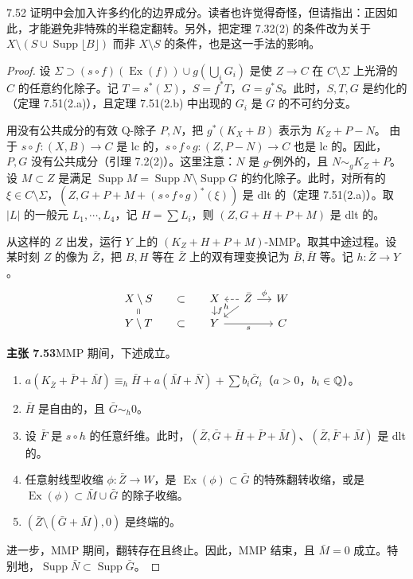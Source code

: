 \begin{remark}{7.52}
证明中会加入许多约化的边界成分。读者也许觉得奇怪，但请指出：正因如此，才能避免非特殊的半稳定翻转。另外，把定理 7.32(2) 的条件改为关于 $X\setminus(S\cup\operatorname{Supp}\lfloor B\rfloor)$ 而非 $X\setminus S$ 的条件，也是这一手法的影响。
\end{remark}

\begin{proof}
设 $\Sigma\supset(s\circ f)(\operatorname{Ex}(f))\cup g(\bigcup_i G_i)$ 是使 $Z\to C$ 在 $C\setminus\Sigma$ 上光滑的 $C$ 的任意约化除子。记 $T=s^*(\Sigma)$，$S=f^*T$，$G=g^*S$。此时，$S,T,G$ 是约化的（定理 7.51(2.a)），且定理 7.51(2.b) 中出现的 $G_i$ 是 $G$ 的不可约分支。

用没有公共成分的有效 Q-除子 $P,N$，把 $g^*(K_X+B)$ 表示为 $K_Z+P-N$。
由于 $s\circ f\colon(X,B)\to C$ 是 lc 的，$s\circ f\circ g\colon(Z,P-N)\to C$ 也是 lc 的。因此，$P,G$ 没有公共成分（引理 7.2(2)）。这里注意：$N$ 是 $g$-例外的，且 $N\sim_g K_Z+P$。设 $M\subset Z$ 是满足 $\operatorname{Supp}M=\operatorname{Supp}N\setminus\operatorname{Supp}G$ 的约化除子。此时，对所有的 $\xi\in C\setminus\Sigma$，$(Z,G+P+M+(s\circ f\circ g)^*(\xi))$ 是 dlt 的（定理 7.51(2.a)）。取 $|L|$ 的一般元 $L_1,\cdots,L_4$，记 $H=\sum L_i$，则 $(Z,G+H+P+M)$ 是 dlt 的。

从这样的 $Z$ 出发，运行 $Y$ 上的 $(K_Z+H+P+M)$-MMP。取其中途过程。设某时刻 $Z$ 的像为 $\bar Z$，把 $B,H$ 等在 $\bar Z$ 上的双有理变换记为 $\bar B,\bar H$ 等。记 $h\colon\bar Z\to Y$。
\[
\begin{tikzcd}[column sep=1.3em,row sep=0.5em]
X\setminus S \arrow[d,equal] & \subset & X \arrow[d,"f"] & \bar Z \arrow[l,dashed] \arrow[r,"\phi"] \arrow[dl,"h"'] & W\\
Y\setminus T & \subset & Y \arrow[rr,"s"'] & & C
\end{tikzcd}
\]

\par\medskip\noindent\textbf{主张 7.53}\quad MMP 期间，下述成立。
\begin{enumerate}[label=(\arabic*),leftmargin=2.4em,itemsep=1pt,topsep=2pt,parsep=0pt]
\item $a(K_{\bar Z}+\bar P+\bar M)\equiv_h\bar H+a(\bar M+\bar N)+\sum b_i\bar G_i$（$a>0$，$b_i\in\mathbb{Q}$）。
\item $\bar H$ 是自由的，且 $\bar G\sim_h0$。
\item 设 $\bar F$ 是 $s\circ h$ 的任意纤维。此时，$(\bar Z,\bar G+\bar H+\bar P+\bar M)$、$(\bar Z,\bar F+\bar M)$ 是 dlt 的。
\item 任意射线型收缩 $\phi\colon\bar Z\to W$，是 $\operatorname{Ex}(\phi)\subset\bar G$ 的特殊翻转收缩，或是 $\operatorname{Ex}(\phi)\subset\bar M\cup\bar G$ 的除子收缩。
\item $(\bar Z\setminus(\bar G+\bar M),0)$ 是终端的。
\end{enumerate}
进一步，MMP 期间，翻转存在且终止。因此，MMP 结束，且 $\bar M=0$ 成立。特别地，$\operatorname{Supp}\bar N\subset\operatorname{Supp}\bar G$。


\end{proof}
